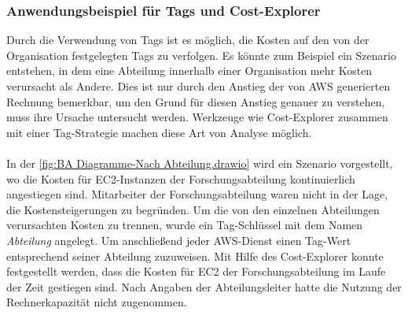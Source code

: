 \subsubsection*{Anwendungsbeispiel für Tags und Cost-Explorer}
Durch die Verwendung von Tags ist es möglich, die Kosten auf den von der Organisation festgelegten Tags zu verfolgen. Es könnte zum Beispiel ein Szenario entstehen, in dem eine Abteilung innerhalb einer Organisation mehr Kosten verursacht als Andere. Dies ist nur durch den Anstieg der von AWS generierten Rechnung bemerkbar, um den Grund für diesen Anstieg genauer zu verstehen, muss ihre Ursache untersucht werden. Werkzeuge wie Cost-Explorer zusammen mit einer Tag-Strategie machen diese Art von Analyse möglich.
\\\\
In der \autoref{fig:BA Diagramme-Nach Abteilung.drawio} wird ein Szenario vorgestellt, wo die Kosten für EC2-Instanzen der Forschungsabteilung kontinuierlich angestiegen sind. Mitarbeiter der Forschungsabteilung waren nicht in der Lage, die Kostensteigerungen zu begründen. 
Um die von den einzelnen Abteilungen verursachten Kosten zu trennen, wurde ein Tag-Schlüssel mit dem Namen \textit{Abteilung} angelegt. Um anschließend jeder AWS-Dienst einen Tag-Wert entsprechend seiner Abteilung zuzuweisen. Mit Hilfe des Cost-Explorer konnte festgestellt werden, dass die Kosten für EC2 der Forschungsabteilung im Laufe der Zeit gestiegen sind. Nach Angaben der Abteilungsleiter hatte die Nutzung der Rechnerkapazität nicht zugenommen.  
\newpage
